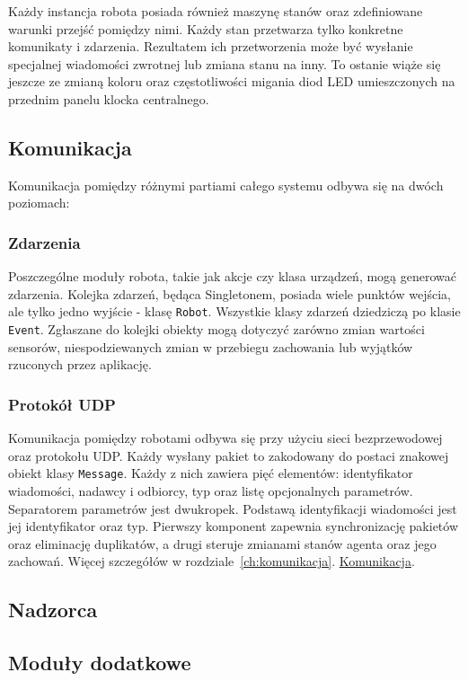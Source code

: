 Każdy instancja robota posiada również maszynę stanów oraz zdefiniowane warunki przejść pomiędzy nimi. Każdy stan przetwarza tylko konkretne komunikaty i zdarzenia. Rezultatem ich przetworzenia może być wysłanie specjalnej wiadomości zwrotnej lub zmiana stanu na inny. To ostanie wiąże się jeszcze ze zmianą koloru oraz częstotliwości migania diod LED umieszczonych na przednim panelu klocka centralnego.


\subsection{Komunikacja}

\indent \indent Komunikacja pomiędzy różnymi partiami całego systemu odbywa się na dwóch poziomach:

\subsubsection{Zdarzenia}

Poszczególne moduły robota, takie jak akcje czy klasa urządzeń, mogą generować zdarzenia. Kolejka zdarzeń, będąca Singletonem, posiada wiele punktów wejścia, ale tylko jedno wyjście - klasę {\tt Robot}. Wszystkie klasy zdarzeń dziedziczą po klasie {\tt Event}. Zgłaszane do kolejki obiekty mogą dotyczyć zarówno zmian wartości sensorów, niespodziewanych zmian w przebiegu zachowania lub wyjątków rzuconych przez aplikację.


\subsubsection{Protokół UDP}

Komunikacja pomiędzy robotami odbywa się przy użyciu sieci bezprzewodowej oraz protokołu UDP. Każdy wysłany pakiet to zakodowany do postaci znakowej obiekt klasy {\tt Message}. Każdy z nich zawiera pięć elementów: identyfikator wiadomości, nadawcy i odbiorcy, typ oraz listę opcjonalnych parametrów. Separatorem parametrów jest dwukropek. Podstawą identyfikacji wiadomości jest jej identyfikator oraz typ. Pierwszy komponent zapewnia synchronizację pakietów oraz eliminację duplikatów, a drugi steruje zmianami stanów agenta oraz jego zachowań. Więcej szczegółów w rozdziale~\ref{ch:komunikacja}. \hyperref[ch:komunikacja]{Komunikacja}.

\subsection{Nadzorca}

\subsection{Moduły dodatkowe}
